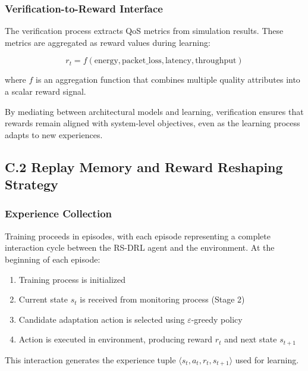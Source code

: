 \documentclass[11pt,a4paper]{article}
\begin{document}
\subsubsection{Verification-to-Reward Interface}

The verification process extracts QoS metrics from simulation results. These metrics are aggregated as reward values during learning:

\[
r_t = f(\text{energy}, \text{packet\_loss}, \text{latency}, \text{throughput})
\]

where $f$ is an aggregation function that combines multiple quality attributes into a scalar reward signal.

By mediating between architectural models and learning, verification ensures that rewards remain aligned with system-level objectives, even as the learning process adapts to new experiences.


\subsection{C.2 Replay Memory and Reward Reshaping Strategy}
\label{app:replay-memory}

\subsubsection{Experience Collection}

Training proceeds in episodes, with each episode representing a complete interaction cycle between the RS-DRL agent and the environment. At the beginning of each episode:

\begin{enumerate}
    \item Training process is initialized
    \item Current state $s_t$ is received from monitoring process (Stage 2)
    \item Candidate adaptation action is selected using $\varepsilon$-greedy policy
    \item Action is executed in environment, producing reward $r_t$ and next state $s_{t+1}$
\end{enumerate}

This interaction generates the experience tuple $\langle s_t, a_t, r_t, s_{t+1} \rangle$ used for learning.
\end{document}
